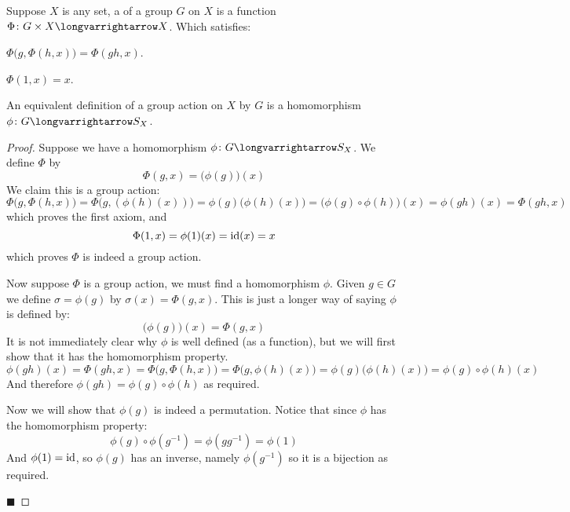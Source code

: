 \documentclass[10pt]{article}
\begin{document}
\begin{defn*}

    Suppose $X$ is any set, a  of a group $G$ on $X$ is a function $\Phi\colon G\times X\longvarrightarrow X$.
    Which satisfies:
    \benum
        \item $\Phi\bigl(g,\Phi(h,x)\bigr)=\Phi(gh,x)$.
        \item $\Phi(1,x)=x$.
    \eenum

\end{defn*}

\begin{thrm*}

    An equivalent definition of a group action on $X$ by $G$ is a homomorphism $\phi\colon G\longvarrightarrow S_X$.

\end{thrm*}

\begin{proof}

    Suppose we have a homomorphism $\phi\colon G\longvarrightarrow S_X$.
    We define $\Phi$ by
    \[ \Phi(g,x) = \bigl(\phi(g)\bigr)(x) \]
    We claim this is a group action:
    \[ \Phi\bigl(g,\Phi(h,x)\bigr)=\Phi\bigl(g,(\phi(h)(x))\bigr)=\phi(g)\bigl(\phi(h)(x)\bigr)=\bigl(\phi(g)\circ\phi(h)\bigr)(x) = \phi(gh)(x) = \Phi(gh,x) \]
    which proves the first axiom, and
    \[ \Phi(1,x) = \phi(1)(x) = {\rm id}(x) = x \]
    which proves $\Phi$ is indeed a group action.

    Now suppose $\Phi$ is a group action, we must find a homomorphism $\phi$.
    Given $g\in G$ we define $\sigma=\phi(g)$ by $\sigma(x)=\Phi(g,x)$.
    This is just a longer way of saying $\phi$ is defined by:
    \[ \bigl(\phi(g)\bigr)(x) = \Phi(g,x) \]
    It is not immediately clear why $\phi$ is well defined (as a function), but we will first show that it has the homomorphism property.
    \[ \phi(gh)(x)=\Phi(gh,x)=\Phi\bigl(g,\Phi(h,x)\bigr)=\Phi\bigl(g,\phi(h)(x)\bigr) = \phi(g)\bigl(\phi(h)(x)\bigr) = \phi(g)\circ\phi(h)(x) \]
    And therefore $\phi(gh)=\phi(g)\circ\phi(h)$ as required.

    Now we will show that $\phi(g)$ is indeed a permutation.
    Notice that since $\phi$ has the homomorphism property:
    \[ \phi(g)\circ\phi(g^{-1})=\phi(gg^{-1}) = \phi(1) \]
    And $\phi(1)={\rm id}$, so $\phi(g)$ has an inverse, namely $\phi(g^{-1})$ so it is a bijection as required.

    \hfill$\blacksquare$

\end{proof}
\end{document}
